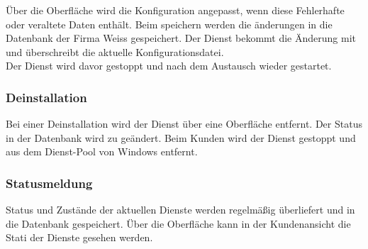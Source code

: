 Über die Oberfläche wird die Konfiguration angepasst, wenn diese Fehlerhafte oder veraltete Daten enthält. Beim speichern werden die änderungen in die Datenbank der Firma Weiss gespeichert. Der Dienst bekommt die Änderung mit und überschreibt die aktuelle Konfigurationsdatei. \\
Der Dienst wird davor gestoppt und nach dem Austausch wieder gestartet. 

\subsubsection{Deinstallation}
\label{sec:Fall_Deinstallation}

Bei einer Deinstallation wird der Dienst über eine Oberfläche entfernt. Der Status in der Datenbank wird zu  geändert. Beim Kunden wird der Dienst gestoppt und aus dem Dienst-Pool von Windows entfernt.

\subsubsection{Statusmeldung}
\label{sec:Fall_Status}

Status und Zustände der aktuellen Dienste werden regelmäßig überliefert und in die Datenbank gespeichert. Über die Oberfläche kann in der Kundenansicht die Stati der Dienste gesehen werden. 


